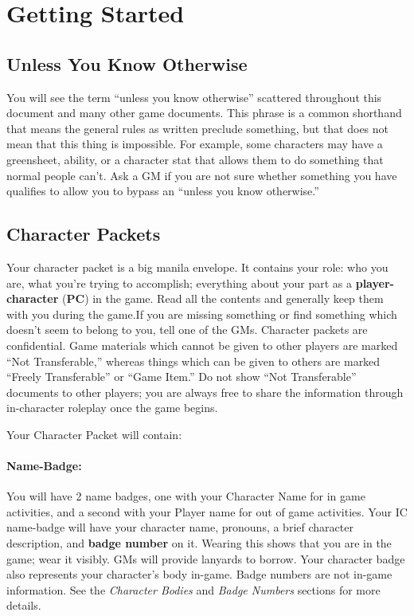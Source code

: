 \documentclass[sheet]{GL2020}
\begin{document}
\section{Getting Started}
\subsection{Unless You Know Otherwise}
You will see the term ``unless you know otherwise'' scattered throughout this document and many other game documents. This phrase is a common shorthand that means the general rules as written preclude something, but that does not mean that this thing is impossible. For example, some characters may have a greensheet, ability, or a character stat that allows them to do something that normal people can't. Ask a GM if you are not sure whether something you have qualifies to allow you to bypass an ``unless you know otherwise.''

\subsection{Character Packets}

Your character packet is a big manila envelope.  It contains your role: who you are, what you're trying to accomplish; everything about your part as a {\bf player-character} ({\bf PC}) in the game. Read all the contents and generally keep them with you during the game.If you are missing something or find something which doesn't seem to belong to you, tell one of the GMs.  Character packets are confidential. Game materials which cannot be given to other players are marked ``Not Transferable,'' whereas things which can be given to others are marked ``Freely Transferable'' or ``Game Item.''  Do not show ``Not Transferable'' documents to other players; you are always free to share the information through in-character roleplay once the game begins.

Your Character Packet will contain:
\paragraph{Name-Badge:} You will have 2 name badges, one with your Character Name for in game activities, and a second with your Player name for out of game activities. Your IC name-badge will have your character name, pronouns, a brief character description, and {\bf badge number} on it. Wearing this shows that you are in the game; wear it visibly. GMs will provide lanyards to borrow.  Your character badge also represents your character's body in-game.  Badge numbers are not in-game information. See the \emph{Character Bodies} and \emph{Badge Numbers} sections for more details.
\end{document}
